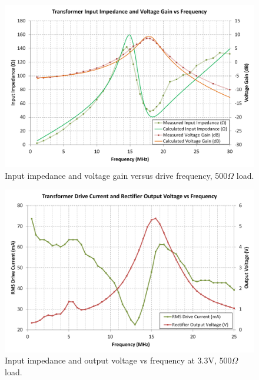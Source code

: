 \documentclass[conference]{IEEEtran}
\begin{document}
	\begin{figure}[t]
		\centering
		\includegraphics[width=1.0\columnwidth]{./img/NoRectTF}
		\caption{Input impedance and voltage gain versus drive frequency, 500$\Omega$ load.}
		\label{fig:NoRect}
	\end{figure}

	\begin{figure}[t]
		\centering
		\includegraphics[width=1\columnwidth]{./img/ZandVoutVsF_3V3}
		\caption{Input impedance and output voltage vs frequency at 3.3V, 500$\Omega$ load.}
		\label{fig:ZandVvsF}
	\end{figure}
	
\end{document}
